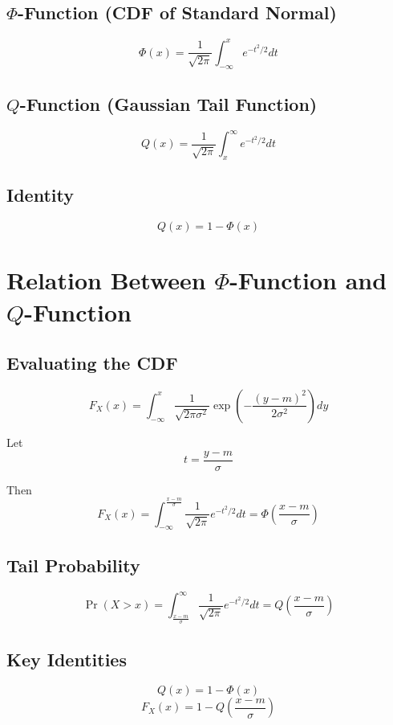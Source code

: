 \documentclass[12pt]{article}
\begin{document}
\subsection*{$\Phi$-Function (CDF of Standard Normal)}

\[
\Phi(x) = \frac{1}{\sqrt{2\pi}} \int_{-\infty}^{x} e^{-t^2/2} dt
\]

\subsection*{$Q$-Function (Gaussian Tail Function)}

\[
Q(x) = \frac{1}{\sqrt{2\pi}} \int_{x}^{\infty} e^{-t^2/2} dt
\]

\subsection*{Identity}

\[
Q(x) = 1 - \Phi(x)
\]

\section*{Relation Between $\Phi$-Function and $Q$-Function}

\subsection*{Evaluating the CDF}

\[
F_X(x) = \int_{-\infty}^{x} \frac{1}{\sqrt{2\pi\sigma^2}}
\exp\left(-\frac{(y-m)^2}{2\sigma^2}\right) dy
\]

Let
\[
t = \frac{y-m}{\sigma}
\]

Then
\[
F_X(x) = \int_{-\infty}^{\frac{x-m}{\sigma}}
\frac{1}{\sqrt{2\pi}} e^{-t^2/2} dt
= \Phi\left(\frac{x-m}{\sigma}\right)
\]

\subsection*{Tail Probability}

\[
\Pr(X > x) =
\int_{\frac{x-m}{\sigma}}^{\infty}
\frac{1}{\sqrt{2\pi}} e^{-t^2/2} dt
= Q\left(\frac{x-m}{\sigma}\right)
\]

\subsection*{Key Identities}

\[
Q(x) = 1 - \Phi(x)
\]
\[
F_X(x) = 1 - Q\left(\frac{x-m}{\sigma}\right)
\]
\end{document}

